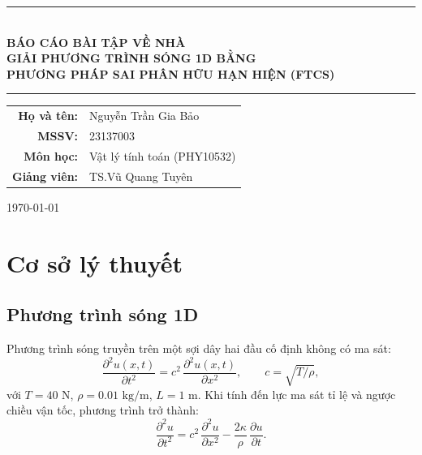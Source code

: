\documentclass[12pt,a4paper]{article}
\begin{document}
\begin{titlepage}
    \centering
    \vspace*{2cm}
    \rule{\textwidth}{1pt} \\[0.5cm]
    {\huge \textbf{BÁO CÁO BÀI TẬP VỀ NHÀ}} \\[0.4cm]
    {\large \textbf{GIẢI PHƯƠNG TRÌNH SÓNG 1D BẰNG}} \\[0.2cm]
    {\large \textbf{PHƯƠNG PHÁP SAI PHÂN HỮU HẠN HIỆN (FTCS)}} \\[0.2cm]
    \rule{\textwidth}{1pt}

    \vspace{2cm}

    {\large
    \begin{tabular}{rl}
        \textbf{Họ và tên:}  & Nguyễn Trần Gia Bảo \\[4pt]
        \textbf{MSSV:}       & 23137003 \\[4pt]
        \textbf{Môn học:}    & Vật lý tính toán (PHY10532) \\[4pt]
        \textbf{Giảng viên:} & TS.\@ Vũ Quang Tuyên \\
    \end{tabular}
    }

    \vfill
    {\large \today}
\end{titlepage}

\newpage
\tableofcontents
\newpage

\section{Cơ sở lý thuyết}

\subsection{Phương trình sóng 1D}

Phương trình sóng truyền trên một sợi dây hai đầu cố định không có ma sát:
\begin{equation}
\frac{\partial^2 u(x,t)}{\partial t^2} = c^2\,\frac{\partial^2 u(x,t)}{\partial x^2},\qquad c=\sqrt{T/\rho},
\end{equation}
với $T=40\text{ N}$, $\rho=0.01\text{ kg/m}$, $L=1\text{ m}$. Khi tính đến lực ma sát tỉ lệ và ngược chiều vận tốc, phương trình trở thành:
\begin{equation}
\frac{\partial^2 u}{\partial t^2} = c^2\,\frac{\partial^2 u}{\partial x^2} - \frac{2\kappa}{\rho}\,\frac{\partial u}{\partial t}.
\end{equation}
\end{document}
